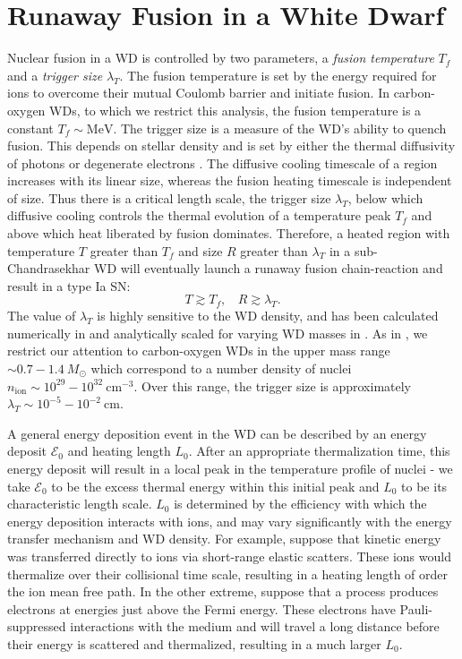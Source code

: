 \documentclass[twocolumn,showpacs,preprintnumbers,amsmath,amssymb,prd]{revtex4}
\newcommand{\MeV}{\text{MeV}}
\newcommand{\cm}{\text{cm}}
\begin{document}
\section{Runaway Fusion in a White Dwarf}
\label{sec:Review}

Nuclear fusion in a WD is controlled by two parameters, a \emph{fusion temperature} $T_f$ and a \emph{trigger size} $\lambda_T$.
The fusion temperature is set by the energy required for ions to overcome their mutual Coulomb barrier and initiate fusion.
In carbon-oxygen WDs, to which we restrict this analysis, the fusion temperature is a constant $T_f \sim \MeV$.
The trigger size is a measure of the WD's ability to quench fusion.
This depends on stellar density and is set by either the thermal diffusivity of photons or degenerate electrons \cite{Woosley}.
The diffusive cooling timescale of a region increases with its linear size, whereas the fusion heating timescale is independent of size.
Thus there is a critical length scale, the trigger size $\lambda_T$, below which diffusive cooling controls the thermal evolution of a temperature peak $T_f$ and above which heat liberated by fusion dominates.
Therefore, a heated region with temperature $T$ greater than $T_f$ and size $R$ greater than $\lambda_T$ in a sub-Chandrasekhar WD will eventually launch a runaway fusion chain-reaction and result in a type Ia SN:
\begin{equation}
\label{eq:runaway}
  T \gtrsim T_f, ~~~~ R \gtrsim \lambda_T.
\end{equation}
The value of $\lambda_T$ is highly sensitive to the WD density, and has been calculated numerically in \cite{Woosley} and analytically scaled for varying WD masses in \cite{Graham:2015apa}.
As in \cite{Graham:2015apa}, we restrict our attention to carbon-oxygen WDs in the upper mass range $\sim 0.7 - 1.4 ~M_{\odot}$ which correspond to a number density of nuclei $n_\text{ion} \sim 10^{29} - 10^{32} ~\cm^{-3}$.
Over this range, the trigger size is approximately $\lambda_T \sim 10^{-5} - 10^{-2} ~\text{cm}$.

A general energy deposition event in the WD can be described by an energy deposit $\mathcal{E}_0$ and heating length $L_0$.
After an appropriate thermalization time, this energy deposit will result in a local peak in the temperature profile of nuclei - we take $\mathcal{E}_0$ to be the excess thermal energy within this initial peak and $L_0$ to be its characteristic length scale.
$L_0$ is determined by the efficiency with which the energy deposition interacts with ions, and may vary significantly with the energy transfer mechanism and WD density.
For example, suppose that kinetic energy was transferred directly to ions via short-range elastic scatters.
These ions would thermalize over their collisional time scale, resulting in a heating length of order the ion mean free path.
In the other extreme, suppose that a process produces electrons at energies just above the Fermi energy.
These electrons have Pauli-suppressed interactions with the medium and will travel a long distance before their energy is scattered and thermalized, resulting in a much larger $L_0$.
\end{document}
